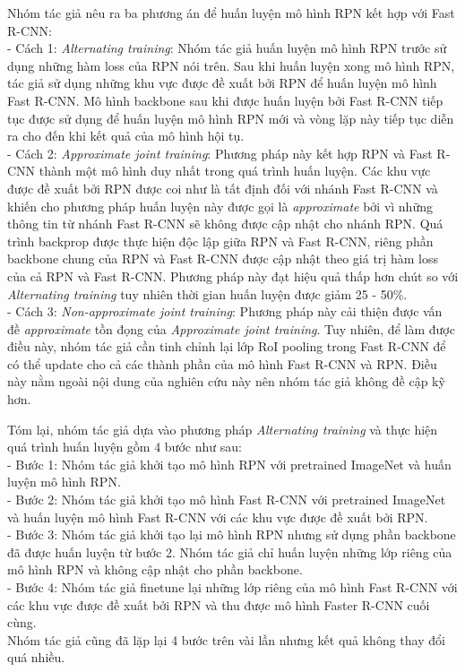{    \noindent
    Nhóm tác giả nêu ra ba phương án để huấn luyện mô hình RPN kết hợp với Fast R-CNN: \\
    - Cách 1: \textit{Alternating training}: Nhóm tác giả huấn luyện mô hình RPN trước sử dụng những hàm loss của RPN nói trên.
    Sau khi huấn luyện xong mô hình RPN, tác giả sử dụng những khu vực được đề xuất bởi RPN để huấn luyện mô hình Fast R-CNN.
    Mô hình backbone sau khi được huấn luyện bởi Fast R-CNN tiếp tục được sử dụng để huấn luyện mô hình RPN mới và vòng lặp này tiếp tục diễn ra cho đến khi kết quả của mô hình hội tụ. \\
    - Cách 2: \textit{Approximate joint training}: Phương pháp này kết hợp RPN và Fast R-CNN thành một mô hình duy nhất trong quá trình huấn luyện.
    Các khu vực được đề xuất bởi RPN được coi như là tất định đối với nhánh Fast R-CNN và khiến cho phương pháp huấn luyện này được gọi là \textit{approximate} bởi vì những thông tin từ nhánh Fast R-CNN sẽ không được cập nhật cho nhánh RPN.
    Quá trình backprop được thực hiện độc lập giữa RPN và Fast R-CNN, riêng phần backbone chung của RPN và Fast R-CNN được cập nhật theo giá trị hàm loss của cả RPN và Fast R-CNN.
    Phương pháp này đạt hiệu quả thấp hơn chút so với \textit{Alternating training} tuy nhiên thời gian huấn luyện được giảm 25 - 50\%. \\
    - Cách 3: \textit{Non-approximate joint training}: Phương pháp này cải thiện được vấn đề \textit{approximate} tồn đọng của \textit{Approximate joint training}.
    Tuy nhiên, để làm được điều này, nhóm tác giả cần tinh chỉnh lại lớp RoI pooling trong Fast R-CNN để có thể update cho cả các thành phần của mô hình Fast R-CNN và RPN.
    Điều này nằm ngoài nội dung của nghiên cứu này nên nhóm tác giả không đề cập kỹ hơn.

    \noindent
    Tóm lại, nhóm tác giả dựa vào phương pháp \textit{Alternating training} và thực hiện quá trình huấn luyện gồm 4 bước như sau: \\
    - Bước 1: Nhóm tác giả khởi tạo mô hình RPN với pretrained ImageNet và huấn luyện mô hình RPN. \\
    - Bước 2: Nhóm tác giả khởi tạo mô hình Fast R-CNN với pretrained ImageNet và huấn luyện mô hình Fast R-CNN với các khu vực được đề xuất bởi RPN. \\
    - Bước 3: Nhóm tác giả khởi tạo lại mô hình RPN nhưng sử dụng phần backbone đã được huấn luyện từ bước 2.
    Nhóm tác giả chỉ huấn luyện những lớp riêng của mô hình RPN và không cập nhật cho phần backbone. \\
    - Bước 4: Nhóm tác giả finetune lại những lớp riêng của mô hình Fast R-CNN với các khu vực được đề xuất bởi RPN và thu được mô hình Faster R-CNN cuối cùng. \\
    Nhóm tác giả cũng đã lặp lại 4 bước trên vài lần nhưng kết quả không thay đổi quá nhiều.

}
